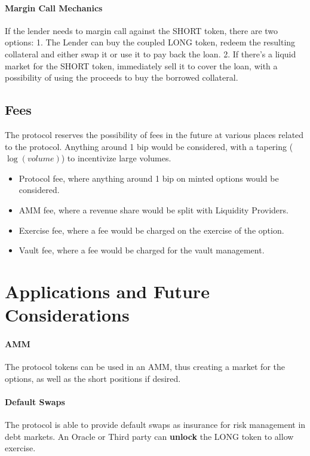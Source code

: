 \documentclass[%
 reprint,
 amsmath,amssymb,
 aps,
]{revtex4-2}
\begin{document}
\paragraph*{Margin Call Mechanics}
If the lender needs to margin call against the SHORT token, there are two options: 1. The Lender can buy the coupled LONG token, redeem the resulting collateral and either swap it or use it to pay back the loan. 2. If there's a liquid market for the SHORT token, immediately sell it to cover the loan, with a possibility of using the proceeds to buy the borrowed collateral.

\subsection{Fees}
The protocol reserves the possibility of fees in the future at various places related to the protocol.
Anything around 1 bip would be considered, with a tapering ($\log(volume)$) to incentivize large volumes.
\begin{itemize}
  \setlength{\itemsep}{0pt}
  \setlength{\parskip}{0pt}
  \item Protocol fee, where anything around 1 bip on minted options would be considered.
  \item AMM fee, where a revenue share would be split with Liquidity Providers.
  \item Exercise fee, where a fee would be charged on the exercise of the option.
  \item Vault fee, where a fee would be charged for the vault management.
\end{itemize}


\section{Applications and Future Considerations}
\paragraph*{AMM}
The protocol tokens can be used in an AMM, thus creating a market for the options, as well as the short positions if desired. 

\paragraph*{Default Swaps}

The protocol is able to provide default swaps as insurance for risk management in debt markets. 
An Oracle or Third party can \textbf{unlock} the LONG token to allow exercise.
\end{document}
